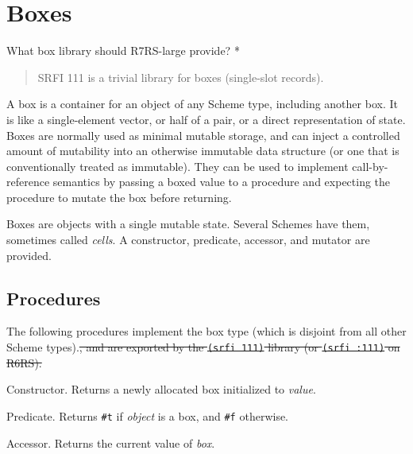 \section{Boxes}
  What box library should R7RS-large provide? *

\begin{quote}
SRFI 111 is a trivial library for boxes (single-slot records).
\end{quote}

A box is a container for an object of any Scheme type, including another
box. It is like a single-element vector, or half of a pair, or a direct
representation of state. Boxes are normally used as minimal mutable
storage, and can inject a controlled amount of mutability into an
otherwise immutable data structure (or one that is conventionally
treated as immutable). They can be used to implement call-by-reference
semantics by passing a boxed value to a procedure and expecting the
procedure to mutate the box before returning.

Boxes are objects with a single mutable state. Several Schemes have
them, sometimes called \emph{cells}. A constructor, predicate, accessor,
and mutator are provided. 



\subsection{Procedures}\label{procedures}

The following procedures implement the box type (which is disjoint from
all other Scheme types).\st{, and are exported by the \texttt{(srfi 111)}
library (or \texttt{(srfi :111)} on R6RS).}

\begin{entry}{%
  }

  Constructor. Returns a newly allocated box initialized to
  \emph{value}.
\end{entry}

\begin{entry}{%
  }

  Predicate. Returns \texttt{\#t} if \emph{object} is a box, and
  \texttt{\#f} otherwise.
\end{entry}

\begin{entry}{%
  }

  Accessor. Returns the current value of \emph{box}.
\end{entry}

